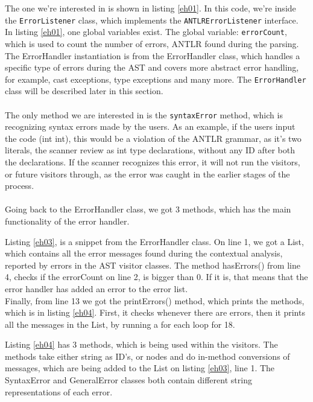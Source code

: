 The one we’re interested in is shown in listing \ref{eh01}. In this code, we’re inside the \texttt{ErrorListener} class, which implements the \texttt{ANTLRErrorListener} interface. In listing \ref{eh01}, one global variables exist. The global variable: \texttt{errorCount}, which is used to count the number of errors, ANTLR found during the parsing.\\
The ErrorHandler instantiation is from the ErrorHandler class, which handles a specific type of errors during the AST and covers more abstract error handling, for example, cast exceptions, type exceptions and many more. The \texttt{ErrorHandler} class will be described later in this section.
\\\\
The only method we are interested in is the \texttt{syntaxError} method, which is recognizing syntax errors made by the users. As an example, if the users input the code (int int), this would be a violation of the ANTLR grammar, as it’s two literals, the scanner review as int type declarations, without any ID after both the declarations. If the scanner recognizes this error, it will not run the visitors, or future visitors through, as the error was caught in the earlier stages of the process.
\\\\
Going back to the ErrorHandler class, we got 3 methods, which has the main functionality of the error handler. 

\noindent\newline
Listing \ref{eh03}, is a snippet from the ErrorHandler class. On line 1, we got a List, which contains all the error messages found during the contextual analysis, reported by errors in the AST visitor classes. The method hasErrors() from line 4, checks if the errorCount on line 2, is bigger than 0. If it is, that means that the error handler has added an error to the error list.\\
Finally, from line 13 we got the printErrors() method, which prints the methods, which is in listing \ref{eh04}. First, it checks whenever there are errors, then it prints all the messages in the List, by running a for each loop for 18. 

\noindent\newline
Listing \ref{eh04} has 3 methods, which is being used within the visitors. The methods take either string as ID’s, or nodes and do in-method conversions of messages, which are being added to the List on listing \ref{eh03}, line 1. The SyntaxError and GeneralError classes both contain different string representations of each error. 
